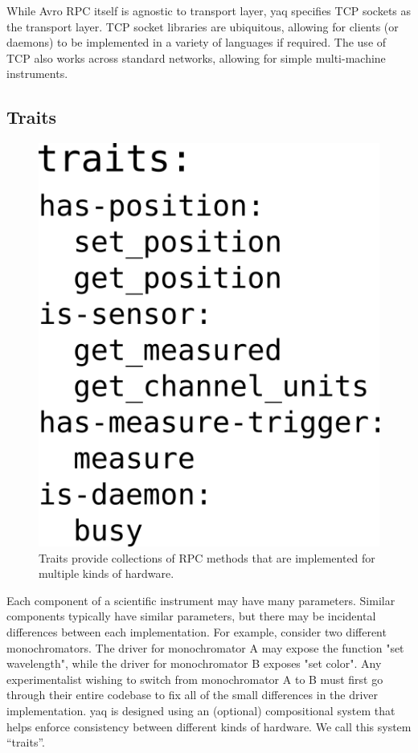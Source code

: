 \documentclass[aip, amsmath, amssymb, reprint,]{revtex4-1}
\begin{document}
While Avro RPC itself is agnostic to transport layer, yaq specifies TCP sockets as the transport layer.
TCP socket libraries are ubiquitous, allowing for clients (or daemons) to be implemented in a variety of languages if required.
The use of TCP also works across standard networks, allowing for simple multi-machine instruments.

\subsection{Traits}

\begin{figure}
  \includegraphics[width=\columnwidth]{./figures/traits.png}
  \caption{  \label{fig:traits} Traits provide collections of RPC methods that are implemented for multiple kinds of hardware.}
\end{figure}

Each component of a scientific instrument may have many parameters.
Similar components typically have similar parameters, but there may be incidental differences between each implementation.
For example, consider two different monochromators.
The driver for monochromator A may expose the function "set wavelength", while the driver for monochromator B exposes "set color".
Any experimentalist wishing to switch from monochromator A to B must first go through their entire codebase to fix all of the small differences in the driver implementation.
yaq is designed using an (optional) compositional system that helps enforce consistency between different kinds of hardware.
We call this system ``traits''.
\end{document}
